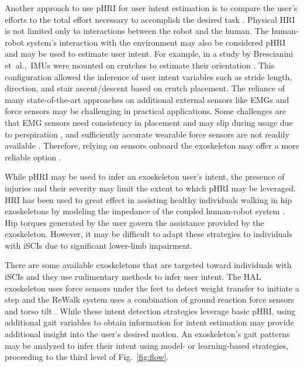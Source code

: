 Another approach to use pHRI for user intent estimation is to compare the user's efforts to the total effort necessary to accomplish the desired task \cite{pehlivan2015minimal}. Physical HRI is not limited only to interactions between the robot and the human. The human-robot system's interaction with the environment may also be considered pHRI and may be used to estimate user intent. For example, in a study by Brescianini \mbox{et al.,}~IMUs were mounted on crutches to estimate their orientation \cite{brescianini2011ins}. This configuration allowed the inference of user intent variables such as stride length, direction, and stair ascent/descent based on crutch placement. The reliance of many state-of-the-art approaches on additional external sensors like EMGs and force sensors may be challenging in practical applications. Some challenges are that EMG sensors need consistency in placement and may slip during usage due to perspiration \cite{tkach2010study,ison2014role}, and sufficiently accurate wearable force sensors are not readily available \cite{moolchandani2021design}. Therefore, relying on sensors onboard the exoskeleton may offer a more reliable option \cite{Gambon20b}. 

While pHRI may be used to infer an exoskeleton user's intent, the presence of injuries and their severity may limit the extent to which pHRI may be leveraged. HRI has been used to great effect in assisting healthy individuals walking in hip exoskeletons by modeling the impedance of the coupled human-robot system \cite{zhang2019admittance,nagarajan2016integral}. Hip torques generated by the user govern the assistance provided by the exoskeleton. However, it may be difficult to adapt these strategies to individuals with iSCIs due to significant lower-limb impairment. 

There are some available exoskeletons that are targeted toward individuals with iSCIs and they use rudimentary methods to infer user intent. The HAL exoskeleton uses force sensors under the feet to detect weight transfer to initiate a step \cite{suzuki2007intention} and the ReWalk system uses a combination of ground reaction force sensors and torso tilt \cite{goffer2012locomotion}. While these intent detection strategies leverage basic pHRI, using additional gait variables to obtain information for intent estimation may provide additional insight into the user's desired motion. An exoskeleton's gait patterns may be analyzed to infer their intent using model- or learning-based strategies, proceeding to the third level of Fig.~\ref{fig:flow}. 

